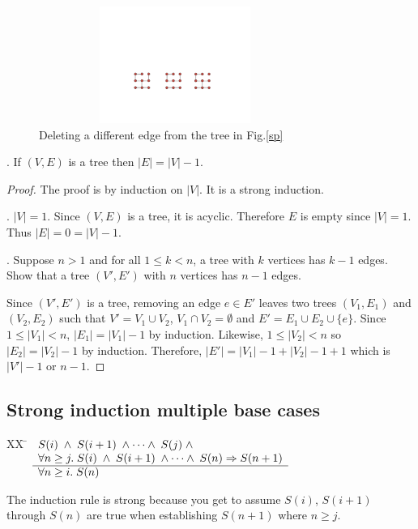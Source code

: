 \documentclass[12pt]{article}
\begin{document}
\begin{figure}[h]
\centering
\includegraphics[width=3.5in, height=1.5in,keepaspectratio=true]{deletededge.pdf}
\caption{Deleting a different edge from the tree in Fig.\ref{sp}}
\label{2sp}
\end{figure}

. If $(V,E)$ is a tree then $|E| = |V| - 1$.

\begin{proof}
The proof is by induction on $|V|$.
It is a strong induction.

. $|V|=1$.  Since $(V,E)$ is a tree, it is acyclic.
Therefore $E$ is empty since $|V|=1$.  Thus $|E|=0=|V|-1$.

.
Suppose $n>1$ and for all $1\leq k < n$, a tree with $k$ vertices has $k-1$ edges.
Show that a tree $(V',E')$ with $n$ vertices has $n-1$ edges.

Since $(V',E')$ is a tree, removing an edge $e\in E'$ leaves two trees
$(V_1,E_1)$ and $(V_2,E_2)$ such that $V'=V_1\cup V_2$, $V_1\cap V_2=\emptyset$ and
$E' = E_1\cup E_2\cup\{e\}$.
Since $1\leq |V_1| < n$, $|E_1|= |V_1|-1$ by induction.
Likewise, $1\leq |V_2| < n$ so $|E_2| = |V_2|-1$ by induction.
Therefore, $|E'| = |V_1| - 1 + |V_2| - 1 + 1$ which is $|V'|-1$ or $n-1$.
\end{proof}

\subsection{Strong induction multiple base cases}
\begin{tabbing}
[3]XX \=  \kill
[3] \>
	\(\begin{array}[t]{l}
	S(i) \;\wedge\; S(i+1)\;\wedge\cdots\wedge\;S(j)\;\wedge\; \\
\forall n \geq j.\;S(i)\;\wedge\;S(i+1)\;\wedge\cdots\wedge\;S(n) \Rightarrow S(n+1) \\
	\hline
	\forall n \geq i. \; S(n)
	\end{array}\) %
\end{tabbing}
The induction rule is strong because you get to assume
$S(i)$, $S(i+1)$ through $S(n)$ are true when establishing $S(n+1)$ where $n\geq j$.
\end{document}
